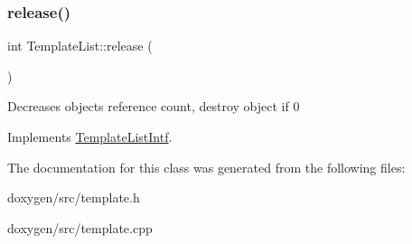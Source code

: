 \subsubsection{\texorpdfstring{release()}{release()}}
{\footnotesize\ttfamily int Template\+List\+::release (\begin{DoxyParamCaption}{ }\end{DoxyParamCaption})\hspace{0.3cm}{\ttfamily [virtual]}}

Decreases object\textquotesingle{}s reference count, destroy object if 0 

Implements \mbox{\hyperlink{class_template_list_intf_a0c53169c740c09dac47efc62bbe39674}{Template\+List\+Intf}}.



The documentation for this class was generated from the following files\+:\begin{DoxyCompactItemize}
\item 
doxygen/src/template.\+h\item 
doxygen/src/template.\+cpp\end{DoxyCompactItemize}
